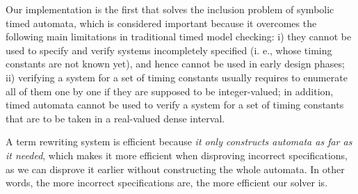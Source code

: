 \documentclass[acmsmall,10pt,review]{acmart}
\begin{document}
Our implementation is the first that solves the  inclusion problem of symbolic timed automata, which is considered important because it overcomes the following main limitations in traditional timed model checking:  i) they cannot be used to specify and verify systems incompletely specified (i. e., whose timing constants are not known yet), and hence cannot be used in early design phases; ii) verifying a system for a set of timing constants usually requires to enumerate all of them one by one if they are supposed to be integer-valued; in addition, timed automata cannot be used to verify a system for a set of timing constants that are to be taken in a real-valued dense interval. 



A term rewriting system is efficient because \emph{it only constructs automata as far as it needed}, which makes it more efficient when disproving incorrect specifications, as we can disprove it earlier without constructing the whole automata. In other words, the more incorrect specifications are, the more efficient our solver is.
\end{document}
